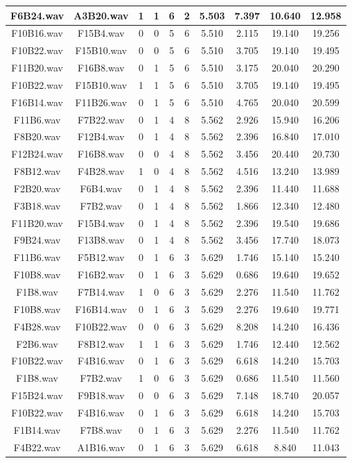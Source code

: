 \documentclass[11pt,a4paper]{book}
\begin{document}
\begin{longtable}[c]{|c|c|c|c|c|c|c|c|c|c|}
F6B24.wav&A3B20.wav&1&1&6&2&5.503&7.397&10.640&12.958\\ \hline
F10B16.wav&F15B4.wav&0&0&5&6&5.510&2.115&19.140&19.256\\ \hline
F10B22.wav&F15B10.wav&0&0&5&6&5.510&3.705&19.140&19.495\\ \hline
F11B20.wav&F16B8.wav&0&1&5&6&5.510&3.175&20.040&20.290\\ \hline
F10B22.wav&F15B10.wav&1&1&5&6&5.510&3.705&19.140&19.495\\ \hline
F16B14.wav&F11B26.wav&0&1&5&6&5.510&4.765&20.040&20.599\\ \hline
F11B6.wav&F7B22.wav&0&1&4&8&5.562&2.926&15.940&16.206\\ \hline
F8B20.wav&F12B4.wav&0&1&4&8&5.562&2.396&16.840&17.010\\ \hline
F12B24.wav&F16B8.wav&0&0&4&8&5.562&3.456&20.440&20.730\\ \hline
F8B12.wav&F4B28.wav&1&0&4&8&5.562&4.516&13.240&13.989\\ \hline
F2B20.wav&F6B4.wav&0&1&4&8&5.562&2.396&11.440&11.688\\ \hline
F3B18.wav&F7B2.wav&0&1&4&8&5.562&1.866&12.340&12.480\\ \hline
F11B20.wav&F15B4.wav&0&1&4&8&5.562&2.396&19.540&19.686\\ \hline
F9B24.wav&F13B8.wav&0&1&4&8&5.562&3.456&17.740&18.073\\ \hline
F11B6.wav&F5B12.wav&0&1&6&3&5.629&1.746&15.140&15.240\\ \hline
F10B8.wav&F16B2.wav&0&1&6&3&5.629&0.686&19.640&19.652\\ \hline
F1B8.wav&F7B14.wav&1&0&6&3&5.629&2.276&11.540&11.762\\ \hline
F10B8.wav&F16B14.wav&0&1&6&3&5.629&2.276&19.640&19.771\\ \hline
F4B28.wav&F10B22.wav&0&0&6&3&5.629&8.208&14.240&16.436\\ \hline
F2B6.wav&F8B12.wav&1&1&6&3&5.629&1.746&12.440&12.562\\ \hline
F10B22.wav&F4B16.wav&0&1&6&3&5.629&6.618&14.240&15.703\\ \hline
F1B8.wav&F7B2.wav&1&0&6&3&5.629&0.686&11.540&11.560\\ \hline
F15B24.wav&F9B18.wav&0&0&6&3&5.629&7.148&18.740&20.057\\ \hline
F10B22.wav&F4B16.wav&0&1&6&3&5.629&6.618&14.240&15.703\\ \hline
F1B14.wav&F7B8.wav&0&1&6&3&5.629&2.276&11.540&11.762\\ \hline
F4B22.wav&A1B16.wav&0&1&6&3&5.629&6.618&8.840&11.043\\ \hline

\end{longtable}
\end{document}
